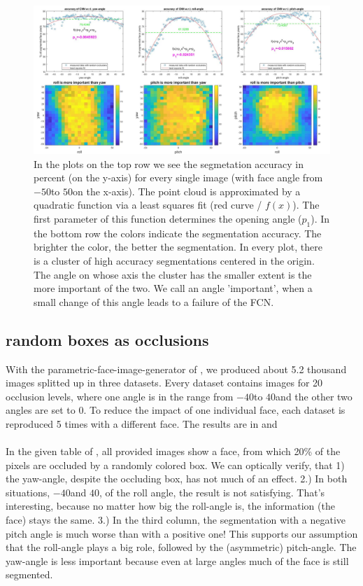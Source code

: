 \begin{figure}[h]
	\centering
	\includegraphics[width=\textwidth]{Figures/evaluation_angles.png}
	\caption{In the plots on the top row we see the segmetation accuracy in percent (on the y-axis) for every single image (with face angle from $-50$\textdegree to $50$\textdegree on the x-axis). The point cloud is approximated by a quadratic function via a least squares fit (red curve / $f(x)$). The first parameter of this function determines the opening angle ($p_1$). In the bottom row the colors indicate the segmentation accuracy. The brighter the color, the better the segmentation. In every plot, there is a cluster of high accuracy segmentations centered in the origin. The angle on whose axis the cluster has the smaller extent is the more important of the two. We call an angle 'important', when a small change of this angle leads to a failure of the FCN.}
	\label{fig:evaluation_angles}
\end{figure}

\subsection{random boxes as occlusions}
With the parametric-face-image-generator of \cite{parametric}, we produced about 5.2 thousand images splitted up in three datasets. Every dataset contains images for 20 occlusion levels, where one angle is in the range from $-40$\textdegree to $40$\textdegree and the other two angles are set to $0$. To reduce the impact of one individual face, each dataset is reproduced 5 times with a different face. The results are in  and \\
\\
In the given table of , all provided images show a face, from which 20\% of the pixels are occluded by a randomly colored box. We can optically verify, that 1) the yaw-angle, despite the occluding box, has not much of an effect. 2.) In both situations, $-40$\textdegree and $40$\textdegree, of the roll angle, the result is not satisfying. That's interesting, because no matter how big the roll-angle is, the information (the face) stays the same. 3.) In the third column, the segmentation with a negative pitch angle is much worse than with a positive one! This supports our assumption that the roll-angle plays a big role, followed by the (asymmetric) pitch-angle. The yaw-angle is less important because even at large angles much of the face is still segmented.\\

